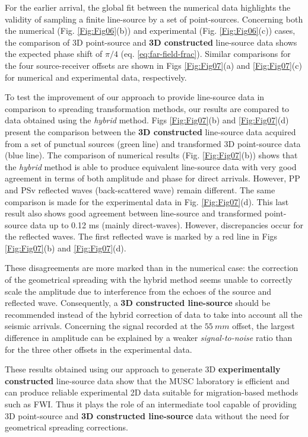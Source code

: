 \documentclass[extra,mreferee]{gji}
\newenvironment{violetnote}{\par\color{BlueViolet}}{\par}
\begin{document}
\begin{violetnote}
For the earlier arrival, the global fit between the numerical data highlights the validity of sampling a finite line-source by a set of point-sources. Concerning both the numerical (Fig. \ref{Fig:Fig06}(b)) and experimental (Fig. \ref{Fig:Fig06}(c)) cases, the comparison of 3D point-source and \textbf{3D constructed} line-source data shows the expected phase shift of $\pi/4$ (eq. \ref{eq:far-field-frac}). Similar comparisons for the four source-receiver offsets are shown in Figs \ref{Fig:Fig07}(a) and \ref{Fig:Fig07}(c) for numerical and experimental data, respectively.

To test the improvement of our approach to provide line-source data in comparison to spreading transformation methods, our results are compared to data obtained using the \textit{hybrid} method. Figs \ref{Fig:Fig07}(b) and \ref{Fig:Fig07}(d) present the comparison between the \textbf{3D constructed} line-source data acquired from a set of punctual sources (green line) and transformed 3D point-source data (blue line). The comparison of numerical results (Fig. \ref{Fig:Fig07}(b)) shows that the \textit{hybrid} method is able to produce equivalent line-source data with very good agreement in terms of both amplitude and phase for direct arrivals. However, PP and PSv reflected waves (back-scattered wave) remain different. The same comparison is made for the experimental data in Fig. \ref{Fig:Fig07}(d). This last result also shows good agreement between line-source and transformed point-source data up to 0.12 ms (mainly direct-waves). However, discrepancies occur for the reflected waves. The first reflected wave is marked by a red line in Figs \ref{Fig:Fig07}(b) and \ref{Fig:Fig07}(d).

These disagreements are more marked than in the numerical case: the correction of the geometrical spreading with the hybrid method seems unable to correctly scale the amplitude due to interference from the echoes of the source and reflected wave. Consequently, a \textbf{3D constructed line-source} should be recommended instead of the hybrid correction of data to take into account all the seismic arrivals. Concerning the signal recorded at the $55\ mm$ offset, the largest difference in amplitude can be explained by a weaker \textit{signal-to-noise} ratio than for the three other offsets in the experimental data. 

These results obtained using our approach to generate 3D  \textbf{experimentally constructed} line-source data show that the MUSC laboratory is efficient and can produce reliable experimental 2D data suitable for migration-based methods such as FWI. Thus it plays the role of an intermediate tool capable of providing 3D point-source and \textbf{3D constructed line-source} data without the need for geometrical spreading corrections.
\end{violetnote}
\end{document}
